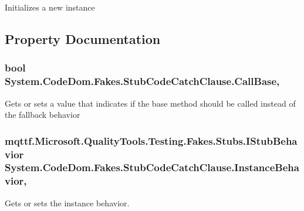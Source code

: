 Initializes a new instance



\subsection{Property Documentation}
\hypertarget{class_system_1_1_code_dom_1_1_fakes_1_1_stub_code_catch_clause_ad6571686078880e3ef39653dab9b47f6}{
\subsubsection[{Call\-Base}]{\setlength{\rightskip}{0pt plus 5cm}bool System.\-Code\-Dom.\-Fakes.\-Stub\-Code\-Catch\-Clause.\-Call\-Base\hspace{0.3cm}{\ttfamily [get]}, {\ttfamily [set]}}}\label{class_system_1_1_code_dom_1_1_fakes_1_1_stub_code_catch_clause_ad6571686078880e3ef39653dab9b47f6}


Gets or sets a value that indicates if the base method should be called instead of the fallback behavior

\hypertarget{class_system_1_1_code_dom_1_1_fakes_1_1_stub_code_catch_clause_a5d6f733c4aeb1f6bf047df7f4d0fec48}{
\subsubsection[{Instance\-Behavior}]{\setlength{\rightskip}{0pt plus 5cm}mqttf.\-Microsoft.\-Quality\-Tools.\-Testing.\-Fakes.\-Stubs.\-I\-Stub\-Behavior System.\-Code\-Dom.\-Fakes.\-Stub\-Code\-Catch\-Clause.\-Instance\-Behavior\hspace{0.3cm}{\ttfamily [get]}, {\ttfamily [set]}}}\label{class_system_1_1_code_dom_1_1_fakes_1_1_stub_code_catch_clause_a5d6f733c4aeb1f6bf047df7f4d0fec48}


Gets or sets the instance behavior.

